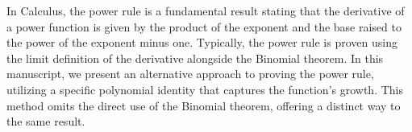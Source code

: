In Calculus, the power rule is a fundamental result stating that the derivative of a power
function is given by the product of the exponent and the base raised to the power of the exponent minus one.
Typically, the power rule is proven using the limit definition of the derivative alongside the Binomial theorem.
In this manuscript, we present an alternative approach to proving the power rule, utilizing a specific polynomial
identity that captures the function's growth.
This method omits the direct use of the Binomial theorem, offering a distinct way to the same result.
